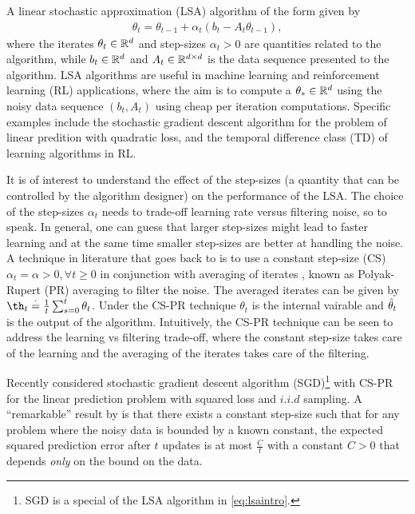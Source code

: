 A linear stochastic approximation (LSA) algorithm of the form given by
\begin{align}\label{eq:lsaintro}
\theta_t=\theta_{t-1}+\alpha_t (b_t-A_t \theta_{t-1}),
\end{align}
where the iterates $\theta_t\in \mathbb{R}^d$ and step-sizes $\alpha_t>0$ are quantities related to the algorithm, while $b_t\in \mathbb{R}^d$ and $A_t\in \mathbb{R}^{d \times d}$ is the data sequence presented to the algorithm.
LSA algorithms are useful in machine learning and reinforcement learning (RL) applications, where the aim is to compute a $\theta_*\in \mathbb{R}^d$ using the noisy data sequence $(b_t,A_t)$ using cheap per iteration computations. Specific examples include the stochastic gradient descent algorithm for the problem of linear predition with quadratic loss, and the temporal difference class (TD) of learning algorithms in RL.\par
It is of interest to understand the effect of the step-sizes (a quantity that can be controlled by the algorithm designer) on the performance of the LSA. The choice of the step-sizes $\alpha_t$ needs to trade-off learning rate versus filtering noise, so to speak. In general, one can guess that larger step-sizes might lead to faster learning and at the same time smaller step-sizes are better at handling the noise. A technique in literature that goes back to \cite{polyak-judisky,ruppert} is to use a constant step-size (CS) $\alpha_t=\alpha>0,\forall t\geq 0$  in conjunction with averaging of iterates , known as Polyak-Rupert (PR) averaging to filter the noise. The averaged iterates can be given by $\th_t\eqdef\frac{1}{t}\sum_{s=0}^t \theta_t$. Under the CS-PR technique $\theta_t$ is the internal vairable and $\hat{\theta}_t$ is the output of the algorithm. Intuitively, the CS-PR technique can be seen to address the learning vs filtering trade-off, where the constant step-size takes care of the learning  and the averaging of the iterates takes care of the filtering. \par
Recently \cite{bach} considered stochastic gradient descent algorithm (SGD)\footnote{SGD is a special of the LSA algorithm in \eqref{eq:lsaintro}.} with CS-PR for the linear prediction problem with squared loss and $i.i.d$ sampling. A ``remarkable'' result by \cite{bach} is that there exists a constant step-size such that for any problem where the noisy data is bounded by a known constant, the expected squared prediction error after $t$ updates is at most $\frac{C}{t}$ with a constant $C>0$ that depends \emph{only} on the bound on the data.
